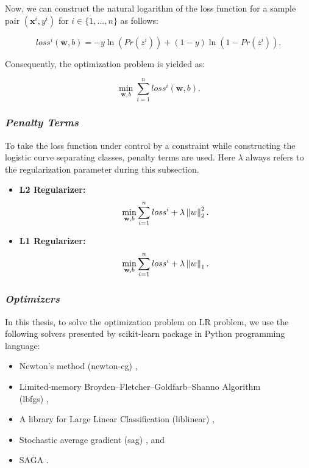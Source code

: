 Now, we can construct the natural logarithm of the loss function for a sample pair $(\textbf{x}^{i}, y^{i})$ for $i \in \{1, ..., n\}$ as follows:

\begin{equation}
\label{log_loss_onesample} 
loss^{i}(\textbf{w}, b) = -y\ln(Pr(z^{i}))  + (1-y)\ln(1-Pr(z^{i})).
\end{equation}

Consequently, the optimization problem is yielded as:

\begin{equation}
\label{lr_optimization} 
\min_{\textbf{w}, b} \sum_{i=1}^{n} loss^{i}(\textbf{w}, b).
\end{equation}

\subsubsection*{\textit{Penalty Terms}}
To take the loss function under control by a constraint while constructing the logistic curve separating classes, penalty terms are used. Here $\lambda$ always refers to the regularization parameter during this subsection.

\begin{itemize}
    \item \textbf{L2 Regularizer:}
        \begin{equation}
        \label{lr_l1} 
        \min_{\textbf{w}, b} \sum_{i=1}^{n} loss^{i} + \lambda \left\lVert w\right\rVert_{2}^{2}.
        \end{equation}
    \item \textbf{L1 Regularizer:}
        \begin{equation}
        \label{lr_l1} 
        \min_{\textbf{w}, b} \sum_{i=1}^{n} loss^{i} + \lambda \left\lVert w\right\rVert_{1}.
        \end{equation}
\end{itemize}


\subsubsection*{\textit{Optimizers}}

In this thesis, to solve the optimization problem on LR problem, we use the following solvers presented by scikit-learn package \cite{scikit-learn} in Python programming language:

\begin{itemize}
    \item Newton’s method (newton-cg) \cite{lr_newton_cg}, 
    
    \item Limited-memory Broyden–Fletcher–Goldfarb–Shanno Algorithm \\(lbfgs) \cite{lr_lbfgsb},
    
    \item A library for Large Linear Classification (liblinear) \cite{lr_liblinear},
    
    \item Stochastic average gradient (sag) \cite{lr_sag}, and
    
    \item SAGA \cite{lr_saga}.
\end{itemize}

